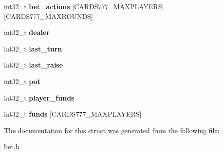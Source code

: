 \begin{DoxyCompactItemize}
\item 
\mbox{\label{structprivatebet__vars_a381939fb9b7f85c0b09f3af728eb5b42}} 
int32\+\_\+t {\bfseries bet\+\_\+actions} \mbox{[}C\+A\+R\+D\+S777\+\_\+\+M\+A\+X\+P\+L\+A\+Y\+E\+RS\mbox{]}\mbox{[}C\+A\+R\+D\+S777\+\_\+\+M\+A\+X\+R\+O\+U\+N\+DS\mbox{]}
\item 
\mbox{\label{structprivatebet__vars_a9fabccec02611d3882520e04ebf0827e}} 
int32\+\_\+t {\bfseries dealer}
\item 
\mbox{\label{structprivatebet__vars_a010311c27ac57ee8379a1c378ccc2dbf}} 
int32\+\_\+t {\bfseries last\+\_\+turn}
\item 
\mbox{\label{structprivatebet__vars_afee2532af1662a5b177f02207be87704}} 
int32\+\_\+t {\bfseries last\+\_\+raise}
\item 
\mbox{\label{structprivatebet__vars_a1b05ab6687bf00d8f08bfd424531e795}} 
int32\+\_\+t {\bfseries pot}
\item 
\mbox{\label{structprivatebet__vars_a0b69fe1b272370c73a04671e4a04fff0}} 
int32\+\_\+t {\bfseries player\+\_\+funds}
\item 
\mbox{\label{structprivatebet__vars_acb9cb80d690397299df31c2495f5ae87}} 
int32\+\_\+t {\bfseries funds} \mbox{[}C\+A\+R\+D\+S777\+\_\+\+M\+A\+X\+P\+L\+A\+Y\+E\+RS\mbox{]}
\end{DoxyCompactItemize}


The documentation for this struct was generated from the following file\+:\begin{DoxyCompactItemize}
\item 
bet.\+h\end{DoxyCompactItemize}
